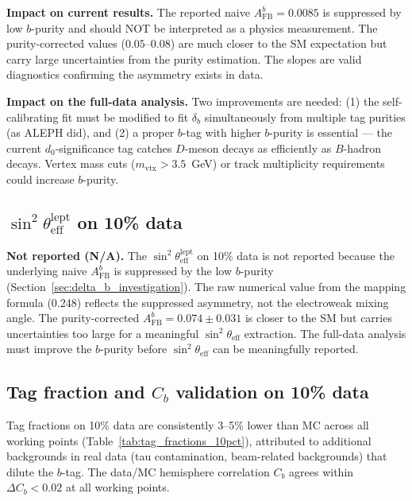 \documentclass[11pt,a4paper]{article}
\begin{document}
\textbf{Impact on current results.} The reported naive $A_\mathrm{FB}^b = 0.0085$ is
suppressed by low $b$-purity and should NOT be interpreted as a physics measurement.
The purity-corrected values ($0.05$--$0.08$) are much closer to the SM expectation
but carry large uncertainties from the purity estimation. The slopes are valid
diagnostics confirming the asymmetry exists in data.

\textbf{Impact on the full-data analysis.} Two improvements are needed:
(1) the self-calibrating fit must be modified to fit $\delta_b$ simultaneously from
multiple tag purities (as ALEPH did), and (2) a proper $b$-tag with higher $b$-purity
is essential --- the current $d_0$-significance tag catches $D$-meson decays as
efficiently as $B$-hadron decays. Vertex mass cuts ($m_\mathrm{vtx} > 3.5$~GeV) or
track multiplicity requirements could increase $b$-purity.

\subsection{$\sin^2\theta_\mathrm{eff}^\mathrm{lept}$ on 10\% data}
\label{sec:result_sin2theta_10pct}

\textbf{Not reported (N/A).} The $\sin^2\theta_\mathrm{eff}^\mathrm{lept}$ on 10\%
data is not reported because the underlying naive $A_\mathrm{FB}^b$ is suppressed
by the low $b$-purity (Section~\ref{sec:delta_b_investigation}).
The raw numerical value from the mapping formula (0.248) reflects
the suppressed asymmetry, not the electroweak mixing angle.
The purity-corrected $A_\mathrm{FB}^b = 0.074 \pm 0.031$ is closer to the SM but
carries uncertainties too large for a meaningful $\sin^2\theta_\mathrm{eff}$ extraction.
The full-data analysis must improve the $b$-purity
before $\sin^2\theta_\mathrm{eff}$ can be meaningfully reported.

\subsection{Tag fraction and $C_b$ validation on 10\% data}
\label{sec:tag_validation_10pct}

Tag fractions on 10\% data are consistently 3--5\% lower than MC across all working
points (Table~\ref{tab:tag_fractions_10pct}), attributed to additional backgrounds
in real data (tau contamination, beam-related backgrounds) that dilute the $b$-tag.
The data/MC hemisphere correlation $C_b$ agrees within $\Delta C_b < 0.02$ at all
working points.
\end{document}
